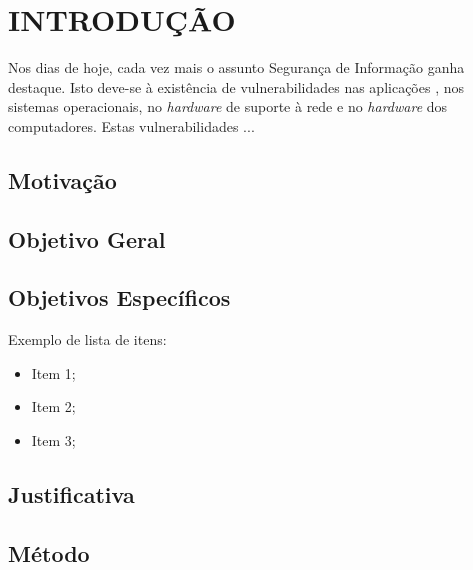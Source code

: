 \chapter{INTRODUÇÃO}
Nos dias de hoje, cada vez mais o assunto Segurança de Informação
ganha destaque. Isto deve-se à existência de vulnerabilidades nas
aplicações \cite{Io02}, nos sistemas operacionais, no \emph{hardware}
de suporte à rede e no \emph{hardware} dos computadores. Estas vulnerabilidades ...


\section{Motivação}\label{mot}


\section{Objetivo Geral}\label{og}


\section{Objetivos Específicos}\label{oe}
Exemplo de lista de itens:
\begin{itemize}
 \item Item 1;
 \item Item 2;
 \item Item 3;
\end{itemize}


\section{Justificativa}\label{just}


\section{Método}\label{met}





